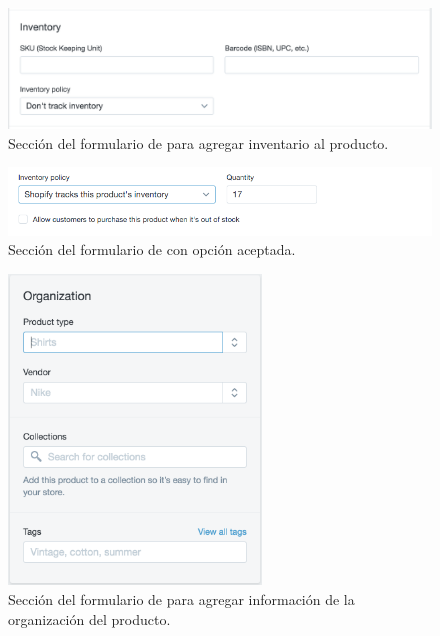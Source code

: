 \begin{figure}[H]
	\centering
	\includegraphics[width=1\textwidth]{figuras/productos/examples/shopify_product_inventory.png}
	\caption{Sección del formulario de \shopifyNAME para agregar inventario al producto.}
	\label{figure:productos:example:shopify_product_inventory}
\end{figure}

\begin{figure}[H]
	\centering
	\includegraphics[width=1\textwidth]{figuras/productos/examples/shopify_product_inventory_tracking_enabled.png}
	\caption{Sección \InventoryForm del formulario de \shopifyNAME con opción \trackingForm aceptada.}
	\label{figure:productos:example:shopify_product_inventory_tracking_enabled}
\end{figure}

\begin{figure}[H]
	\centering
	\includegraphics[width=0.6\textwidth]{figuras/productos/examples/shopify_product_organization.png}
	\caption{Sección del formulario de \shopifyNAME para agregar información de la organización del producto.}
	\label{figure:productos:example:shopify_product_organization}
\end{figure}

